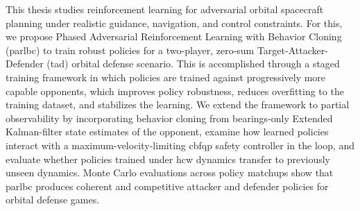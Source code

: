 This thesis studies reinforcement learning for adversarial orbital spacecraft planning under realistic guidance, navigation, and control constraints. For this, we propose Phased Adversarial Reinforcement Learning with Behavior Cloning (\acs{parlbc}) to train robust policies for a two-player, zero-sum Target-Attacker-Defender (\acs{tad}) orbital defense scenario. This is accomplished through a staged training framework in which policies are trained against progressively more capable opponents, which improves policy robustness, reduces overfitting to the training dataset, and stabilizes the learning. We extend the framework to partial observability by incorporating behavior cloning from bearings-only Extended Kalman-filter state estimates of the opponent, examine how learned policies interact with a maximum-velocity-limiting \acs{cbfqp} safety controller in the loop, and evaluate whether policies trained under \acs{hcw} dynamics transfer to previously unseen dynamics. Monte Carlo evaluations across policy matchups show that \acs{parlbc} produces coherent and competitive attacker and defender policies for orbital defense games.